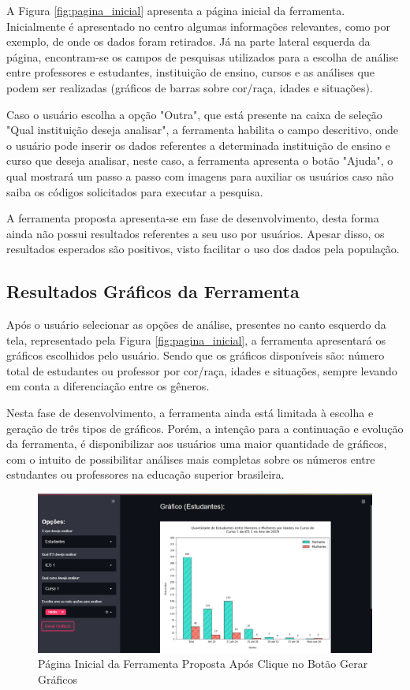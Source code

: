 \documentclass[12pt]{article}
\begin{document}
A Figura \ref{fig:pagina_inicial} apresenta a página inicial da ferramenta. Inicialmente é apresentado no centro algumas informações relevantes, como por exemplo, de onde os dados foram retirados. Já na parte lateral esquerda da página, encontram-se os campos de pesquisas utilizados para a escolha de análise entre professores e estudantes, instituição de ensino, cursos e as análises que podem ser realizadas (gráficos de barras sobre cor/raça, idades e situações).

Caso o usuário escolha a opção "Outra", que está presente na caixa de seleção "Qual instituição deseja analisar", a ferramenta habilita o campo descritivo, onde o usuário pode inserir os dados referentes a determinada instituição de ensino e curso que deseja analisar, neste caso, a ferramenta apresenta o botão "Ajuda", o qual mostrará um passo a passo com imagens para auxiliar os usuários caso não saiba os códigos solicitados para executar a pesquisa.

A ferramenta proposta apresenta-se em fase de desenvolvimento, desta forma ainda não possui resultados referentes a seu uso por usuários. Apesar disso, os resultados esperados são positivos, visto facilitar o uso dos dados pela população.
 
\subsection{Resultados Gráficos da Ferramenta}

Após o usuário selecionar as opções de análise, presentes no canto esquerdo da tela, representado pela Figura \ref{fig:pagina_inicial}, a ferramenta apresentará os gráficos escolhidos pelo usuário. Sendo que os gráficos disponíveis são: número total de estudantes ou professor por cor/raça, idades e situações, sempre levando em conta a diferenciação entre os gêneros. 

Nesta fase de desenvolvimento, a ferramenta ainda está limitada à escolha e geração de três tipos de gráficos. Porém, a intenção para a continuação e evolução da ferramenta, é disponibilizar aos usuários uma maior quantidade de gráficos, com o intuito de possibilitar análises mais completas sobre os números entre estudantes ou professores na educação superior brasileira.

\begin{figure}[H]
\centering
\includegraphics[width=1\textwidth]{grafico_com_interface.png}
\caption{Página Inicial da Ferramenta Proposta Após Clique no Botão Gerar Gráficos}
\label{fig:grafico_com_interface}
\end{figure}
\end{document}
